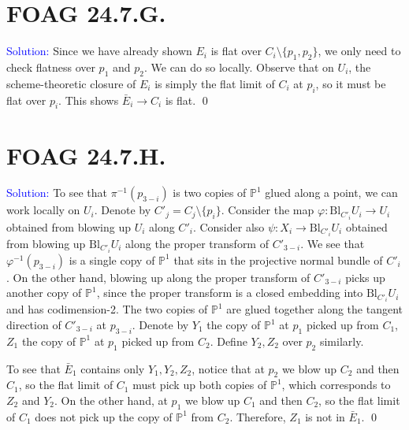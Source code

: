 \documentclass[11pt]{article}
\newcommand{\PP}{\mathbb{P}}
\newcommand{\Bl}{\mathrm{Bl}}
\newenvironment{solution}{\begin{trivlist}\item[]{\textcolor{blue}{Solution:}}}{\qed \end{trivlist}}
\begin{document}
\newpage

\section*{FOAG 24.7.G.}

\begin{solution}
    Since we have already shown $E_i$ is flat over $C_i \setminus \{p_1, p_2\}$, we only need to check flatness over $p_1$ and $p_2$. We can do so locally. Observe that on $U_i$, the scheme-theoretic closure of $E_i$ is simply the flat limit of $C_i$ at $p_i$, so it must be flat over $p_i$. This shows $\bar E_i \rightarrow C_i$ is flat. 
\end{solution}

\newpage

\section*{FOAG 24.7.H.}

\begin{solution}
    To see that $\pi^{-1}(p_{3-i})$ is two copies of $\PP^1$ glued along a point, we can work locally on $U_{i}$. Denote by $C'_j = C_j \setminus \{p_{i}\}$. Consider the map $\varphi: \Bl_{C'_{i}} U_{i} \rightarrow U_{i}$ obtained from blowing up $U_{i}$ along $C'_{i}$. Consider also $\psi: X_i \rightarrow \Bl_{C'_i} U_i$ obtained from blowing up $\Bl_{C'_i} U_i$ along the proper transform of $C'_{3-i}$. We see that $\varphi^{-1}(p_{3-i})$ is a single copy of $\PP^1$ that sits in the projective normal bundle of $C'_i$. On the other hand, blowing up along the proper transform of $C'_{3-i}$ picks up another copy of $\PP^1$, since the proper transform is a closed embedding into $\Bl_{C'_i} U_i$ and has codimension-2. The two copies of $\PP^1$ are glued together along the tangent direction of $C'_{3-i}$ at $p_{3-i}$. Denote by $Y_1$ the copy of $\PP^1$ at $p_1$ picked up from $C_1$, $Z_1$ the copy of $\PP^1$ at $p_1$ picked up from $C_2$. Define $Y_2, Z_2$ over $p_2$ similarly.

    To see that $\bar E_1$ contains only $Y_1, Y_2, Z_2$, notice that at $p_2$ we blow up $C_2$ and then $C_1$, so the flat limit of $C_1$ must pick up both copies of $\PP^1$, which corresponds to $Z_2$ and $Y_2$. On the other hand, at $p_1$ we blow up $C_1$ and then $C_2$, so the flat limit of $C_1$ does not pick up the copy of $\PP^1$ from $C_2$. Therefore, $Z_1$ is not in $\bar E_1$. 
\end{solution}
\end{document}
